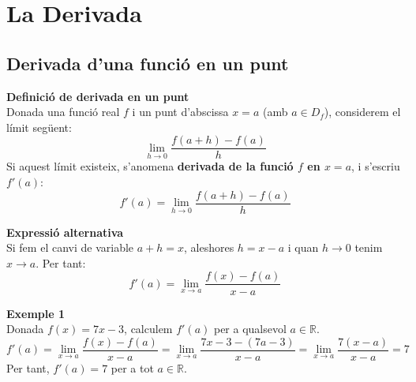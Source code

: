 \documentclass[12pt]{article}
\begin{document}
\section{La Derivada}

\subsection{Derivada d'una funció en un punt}

\begin{concept}
\textbf{Definició de derivada en un punt}\\
Donada una funció real $f$ i un punt d'abscissa $x=a$ (amb $a \in D_f$), considerem el límit següent:
\[
\lim_{h\to 0} \frac{f(a+h)-f(a)}{h}
\]
Si aquest límit existeix, s'anomena \textbf{derivada de la funció $f$ en $x=a$}, i s'escriu $f'(a)$:
\[
\boxed{f'(a)=\lim_{h\to 0} \frac{f(a+h)-f(a)}{h}}
\]

\textbf{Expressió alternativa}\\
Si fem el canvi de variable $a+h = x$, aleshores $h = x-a$ i quan $h\to 0$ tenim $x\to a$. Per tant:
\[
\boxed{f'(a)=\lim_{x\to a} \frac{f(x)-f(a)}{x-a}}
\]
\end{concept}

\begin{exemple}
\textbf{Exemple 1}\\
Donada $f(x)=7x-3$, calculem $f'(a)$ per a qualsevol $a\in\mathbb{R}$.
\[
f'(a)=\lim_{x\to a} \frac{f(x)-f(a)}{x-a}
      =\lim_{x\to a} \frac{7x-3-(7a-3)}{x-a}
      =\lim_{x\to a} \frac{7(x-a)}{x-a}=7
\]
Per tant, $f'(a)=7$ per a tot $a\in\mathbb{R}$.
\end{exemple}
\end{document}
